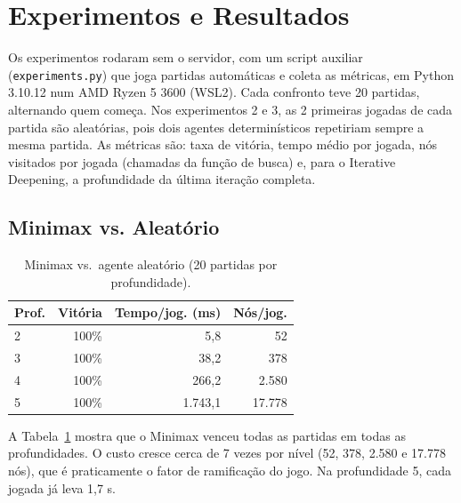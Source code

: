 \documentclass[letterpaper]{article} %
\begin{document}
\section{Experimentos e Resultados}
Os experimentos rodaram sem o servidor, com um script auxiliar (\texttt{experiments.py}) que joga partidas automáticas e coleta as métricas, em Python 3.10.12 num AMD Ryzen 5 3600 (WSL2). Cada confronto teve 20 partidas, alternando quem começa. Nos experimentos 2 e 3, as 2 primeiras jogadas de cada partida são aleatórias, pois dois agentes determinísticos repetiriam sempre a mesma partida. As métricas são: taxa de vitória, tempo médio por jogada, nós visitados por jogada (chamadas da função de busca) e, para o Iterative Deepening, a profundidade da última iteração completa.

\subsection{Minimax vs. Aleatório}
\begin{table}[t]
\centering
\begin{tabular}{lrrr}
\toprule
Prof. & Vitória & Tempo/jog. (ms) & Nós/jog. \\
\midrule
2 & 100\% & 5,8 & 52 \\
3 & 100\% & 38,2 & 378 \\
4 & 100\% & 266,2 & 2.580 \\
5 & 100\% & 1.743,1 & 17.778 \\
\bottomrule
\end{tabular}
\caption{Minimax vs.\ agente aleatório (20 partidas por profundidade).}
\label{tab:minimax-random}
\end{table}
A Tabela~\ref{tab:minimax-random} mostra que o Minimax venceu todas as partidas em todas as profundidades. O custo cresce cerca de 7 vezes por nível (52, 378, 2.580 e 17.778 nós), que é praticamente o fator de ramificação do jogo. Na profundidade 5, cada jogada já leva 1,7 s.
\end{document}
